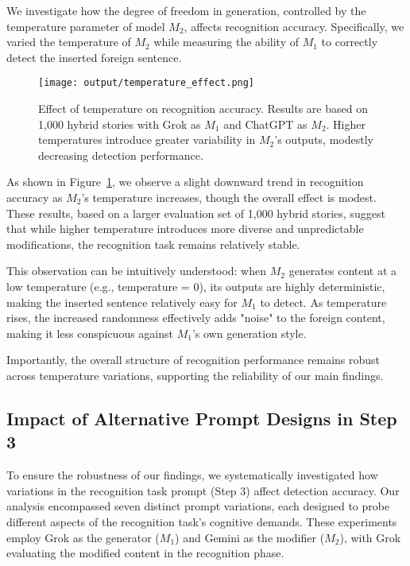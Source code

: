\documentclass{article}
\begin{document}
We investigate how the degree of freedom in generation, controlled by the temperature parameter of model $M_2$, affects recognition accuracy. Specifically, we varied the temperature of $M_2$ while measuring the ability of $M_1$ to correctly detect the inserted foreign sentence.

\begin{figure}[ht]
    \centering
    \texttt{[image: output/temperature\_effect.png]}
\caption{Effect of temperature on recognition accuracy. Results are based on 1,000 hybrid stories with Grok as $M_1$ and ChatGPT as $M_2$. Higher temperatures introduce greater variability in $M_2$'s outputs, modestly decreasing detection performance.}
    \label{fig:temperature_effect}
\end{figure}

As shown in Figure~\ref{fig:temperature_effect}, we observe a slight downward trend in recognition accuracy as $M_2$'s temperature increases, though the overall effect is modest. These results, based on a larger evaluation set of 1,000 hybrid stories, suggest that while higher temperature introduces more diverse and unpredictable modifications, the recognition task remains relatively stable.

This observation can be intuitively understood: when $M_2$ generates content at a low temperature (e.g., temperature = 0), its outputs are highly deterministic, making the inserted sentence relatively easy for $M_1$ to detect. As temperature rises, the increased randomness effectively adds "noise" to the foreign content, making it less conspicuous against $M_1$'s own generation style.

Importantly, the overall structure of recognition performance remains robust across temperature variations, supporting the reliability of our main findings.

\subsection{Impact of Alternative Prompt Designs in Step 3}

To ensure the robustness of our findings, we systematically investigated how variations in the recognition task prompt (Step 3) affect detection accuracy. Our analysis encompassed seven distinct prompt variations, each designed to probe different aspects of the recognition task's cognitive demands. These experiments employ Grok as the generator ($M_1$) and Gemini as the modifier ($M_2$), with Grok evaluating the modified content in the recognition phase.
\end{document}
